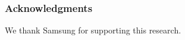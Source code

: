 \documentclass{article}
\begin{document}


\subsubsection*{Acknowledgments}
We thank Samsung for supporting this research.




\small


\medskip

\small
\end{document}
